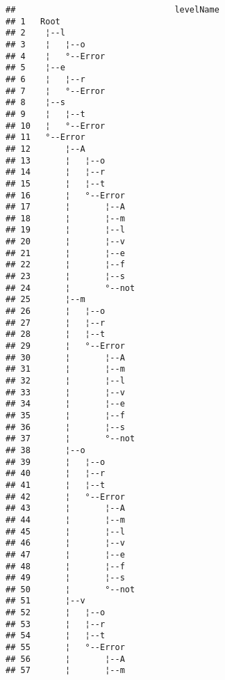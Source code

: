 \documentclass[]{article}
\begin{document}
\begin{verbatim}
##                                levelName
## 1   Root                                
## 2    ¦--l                               
## 3    ¦   ¦--o                           
## 4    ¦   °--Error                       
## 5    ¦--e                               
## 6    ¦   ¦--r                           
## 7    ¦   °--Error                       
## 8    ¦--s                               
## 9    ¦   ¦--t                           
## 10   ¦   °--Error                       
## 11   °--Error                           
## 12       ¦--A                           
## 13       ¦   ¦--o                       
## 14       ¦   ¦--r                       
## 15       ¦   ¦--t                       
## 16       ¦   °--Error                   
## 17       ¦       ¦--A                   
## 18       ¦       ¦--m                   
## 19       ¦       ¦--l                   
## 20       ¦       ¦--v                   
## 21       ¦       ¦--e                   
## 22       ¦       ¦--f                   
## 23       ¦       ¦--s                   
## 24       ¦       °--not                 
## 25       ¦--m                           
## 26       ¦   ¦--o                       
## 27       ¦   ¦--r                       
## 28       ¦   ¦--t                       
## 29       ¦   °--Error                   
## 30       ¦       ¦--A                   
## 31       ¦       ¦--m                   
## 32       ¦       ¦--l                   
## 33       ¦       ¦--v                   
## 34       ¦       ¦--e                   
## 35       ¦       ¦--f                   
## 36       ¦       ¦--s                   
## 37       ¦       °--not                 
## 38       ¦--o                           
## 39       ¦   ¦--o                       
## 40       ¦   ¦--r                       
## 41       ¦   ¦--t                       
## 42       ¦   °--Error                   
## 43       ¦       ¦--A                   
## 44       ¦       ¦--m                   
## 45       ¦       ¦--l                   
## 46       ¦       ¦--v                   
## 47       ¦       ¦--e                   
## 48       ¦       ¦--f                   
## 49       ¦       ¦--s                   
## 50       ¦       °--not                 
## 51       ¦--v                           
## 52       ¦   ¦--o                       
## 53       ¦   ¦--r                       
## 54       ¦   ¦--t                       
## 55       ¦   °--Error                   
## 56       ¦       ¦--A                   
## 57       ¦       ¦--m                   

\end{verbatim}
\end{document}
